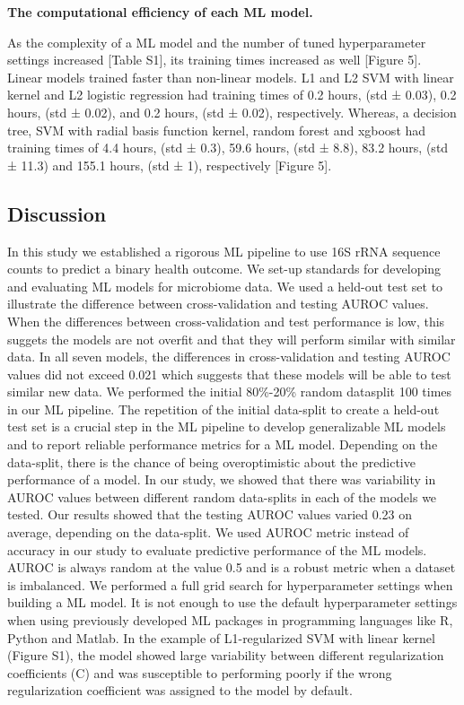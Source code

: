 \documentclass[11pt,]{article}
\begin{document}
\textbf{The computational efficiency of each ML model.}

As the complexity of a ML model and the number of tuned hyperparameter
settings increased {[}Table S1{]}, its training times increased as well
{[}Figure 5{]}. Linear models trained faster than non-linear models. L1
and L2 SVM with linear kernel and L2 logistic regression had training
times of 0.2 hours, (std ± 0.03), 0.2 hours, (std ± 0.02), and 0.2
hours, (std ± 0.02), respectively. Whereas, a decision tree, SVM with
radial basis function kernel, random forest and xgboost had training
times of 4.4 hours, (std ± 0.3), 59.6 hours, (std ± 8.8), 83.2 hours,
(std ± 11.3) and 155.1 hours, (std ± 1), respectively {[}Figure 5{]}.

\subsection{Discussion}\label{discussion}

In this study we established a rigorous ML pipeline to use 16S rRNA
sequence counts to predict a binary health outcome. We set-up standards
for developing and evaluating ML models for microbiome data. We used a
held-out test set to illustrate the difference between cross-validation
and testing AUROC values. When the differences between cross-validation
and test performance is low, this suggets the models are not overfit and
that they will perform similar with similar data. In all seven models,
the differences in cross-validation and testing AUROC values did not
exceed 0.021 which suggests that these models will be able to test
similar new data. We performed the initial 80\%-20\% random datasplit
100 times in our ML pipeline. The repetition of the initial data-split
to create a held-out test set is a crucial step in the ML pipeline to
develop generalizable ML models and to report reliable performance
metrics for a ML model. Depending on the data-split, there is the chance
of being overoptimistic about the predictive performance of a model. In
our study, we showed that there was variability in AUROC values between
different random data-splits in each of the models we tested. Our
results showed that the testing AUROC values varied 0.23 on average,
depending on the data-split. We used AUROC metric instead of accuracy in
our study to evaluate predictive performance of the ML models. AUROC is
always random at the value 0.5 and is a robust metric when a dataset is
imbalanced. We performed a full grid search for hyperparameter settings
when building a ML model. It is not enough to use the default
hyperparameter settings when using previously developed ML packages in
programming languages like R, Python and Matlab. In the example of
L1-regularized SVM with linear kernel (Figure S1), the model showed
large variability between different regularization coefficients (C) and
was susceptible to performing poorly if the wrong regularization
coefficient was assigned to the model by default.
\end{document}
